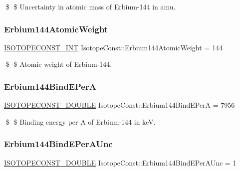 \$ \$ Uncertainty in atomic mass of Erbium-\/144 in amu. \mbox{\label{group___isotope_const-_erbium-_er144_ga93f52a6017e4293dad25094dcec5c527}} 
\subsubsection{\texorpdfstring{Erbium144\+Atomic\+Weight}{Erbium144AtomicWeight}}
{\footnotesize\ttfamily \mbox{\hyperlink{group___isotope_const-_macros_ga5f18360b3e99483a35c32d789e62621c}{I\+S\+O\+T\+O\+P\+E\+C\+O\+N\+S\+T\+\_\+\+I\+NT}} Isotope\+Const\+::\+Erbium144\+Atomic\+Weight = 144}

\$ \$ Atomic weight of Erbium-\/144. \mbox{\label{group___isotope_const-_erbium-_er144_gaaa9bfd9f629517569433e0ee042ddc44}} 
\subsubsection{\texorpdfstring{Erbium144\+Bind\+E\+PerA}{Erbium144BindEPerA}}
{\footnotesize\ttfamily \mbox{\hyperlink{group___isotope_const-_macros_ga8f45a7272ce02c0b4c65c44636ed719a}{I\+S\+O\+T\+O\+P\+E\+C\+O\+N\+S\+T\+\_\+\+D\+O\+U\+B\+LE}} Isotope\+Const\+::\+Erbium144\+Bind\+E\+PerA = 7956}

\$ \$ Binding energy per A of Erbium-\/144 in keV. \mbox{\label{group___isotope_const-_erbium-_er144_ga55d1d8a24f443e0d911e0fed6e9d3e87}} 
\subsubsection{\texorpdfstring{Erbium144\+Bind\+E\+Per\+A\+Unc}{Erbium144BindEPerAUnc}}
{\footnotesize\ttfamily \mbox{\hyperlink{group___isotope_const-_macros_ga8f45a7272ce02c0b4c65c44636ed719a}{I\+S\+O\+T\+O\+P\+E\+C\+O\+N\+S\+T\+\_\+\+D\+O\+U\+B\+LE}} Isotope\+Const\+::\+Erbium144\+Bind\+E\+Per\+A\+Unc = 1}

